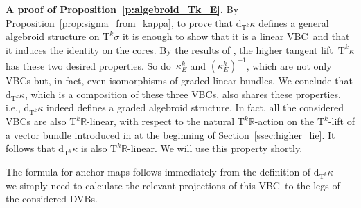 \documentclass[10pt,a4paper]{amsart}
\newcommand{\ZM}{{VBC}} %
\newcommand{\R}{\mathbb{R}}
\newcommand{\dd}{\mathrm{d}}
\newcommand{\TT}[1]{\mathrm{T}^{#1}} %
\numberwithin{equation}{section}
\theoremstyle{definition}
\begin{document}
{\bf A proof of Proposition~\ref{p:algebroid_Tk_E}.} %
By Proposition~\ref{prop:sigma_from_kappa}, to prove that $\dd_{\TT{k}}\kappa$ defines a general algebroid structure on $\TT{k}\sigma$ it is enough to show that it is a linear \ZM\ and that it induces the identity on the cores. By the results of \cite[Theorem~A.5]{MJ_MR_models_high_alg_2015}, the higher tangent lift~$\TT{k}\kappa$ has these two desired properties. So do~$\kappa^k_E$ and $(\kappa^k_E)^{-1}$, which are not only \ZM s but, in fact, even isomorphisms of graded-linear bundles. We conclude that $\dd_{\TT{k}}\kappa$, which is a composition of these three \ZM s, also shares these properties, i.e., $\dd_{\TT{k}}\kappa$ indeed defines a graded algebroid structure. In fact, all the considered \ZM s are also $\TT{k}\R$-linear, with respect to the natural $\TT{k}\R$-action on the $\TT{k}$-lift of a vector bundle introduced in at the beginning of Section~\ref{ssec:higher_lie}. It follows that $\dd_{\TT{k}}\kappa$ is also $\TT{k}\R$-linear. We will use this property shortly.

The formula for anchor maps follows immediately from the definition of $\dd_{\TT{k}}\kappa$ -- we simply need to calculate the relevant projections of this \ZM\ to the legs of the considered DVBs.
\end{document}
